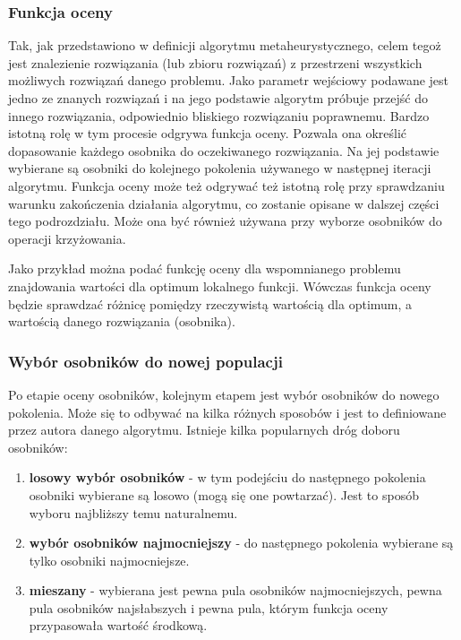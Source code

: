 \subsubsection{Funkcja oceny}
Tak, jak przedstawiono w definicji algorytmu metaheurystycznego, celem tegoż jest znalezienie rozwiązania (lub zbioru rozwiązań) z przestrzeni wszystkich możliwych rozwiązań danego problemu. Jako parametr wejściowy podawane jest jedno ze znanych rozwiązań i na jego podstawie algorytm próbuje przejść do innego rozwiązania, odpowiednio bliskiego rozwiązaniu poprawnemu. Bardzo istotną rolę w tym procesie odgrywa funkcja oceny. Pozwala ona określić dopasowanie każdego osobnika do oczekiwanego rozwiązania. Na jej podstawie wybierane są osobniki do kolejnego pokolenia używanego w następnej iteracji algorytmu. Funkcja oceny może też odgrywać też istotną rolę przy sprawdzaniu warunku zakończenia działania algorytmu, co zostanie opisane w dalszej części tego podrozdziału. Może ona być również używana przy wyborze osobników do operacji krzyżowania.

Jako przykład można podać funkcję oceny dla wspomnianego problemu znajdowania wartości dla optimum lokalnego funkcji. Wówczas funkcja oceny będzie sprawdzać różnicę pomiędzy rzeczywistą wartością dla optimum, a wartością danego rozwiązania (osobnika).

\subsubsection{Wybór osobników do nowej populacji}
Po etapie oceny osobników, kolejnym etapem jest wybór osobników do nowego pokolenia. Może się to odbywać na kilka różnych sposobów i jest to definiowane przez autora danego algorytmu. Istnieje kilka popularnych dróg doboru osobników:

\begin{enumerate}
    \item \textbf{losowy wybór osobników} - w tym podejściu do następnego pokolenia osobniki wybierane są losowo (mogą się one powtarzać). Jest to sposób wyboru najbliższy temu naturalnemu.
    \item \textbf{wybór osobników najmocniejszy} - do następnego pokolenia wybierane są tylko osobniki najmocniejsze.
    \item \textbf{mieszany} - wybierana jest pewna pula osobników najmocniejszych, pewna pula osobników najsłabszych i pewna pula, którym funkcja oceny przypasowała wartość środkową.
\end{enumerate}

